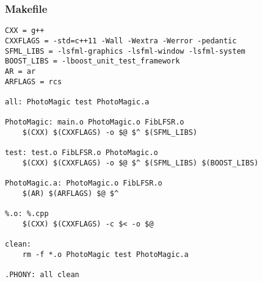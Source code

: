 \documentclass[12pt]{article}
\begin{document}
\subsubsection{Makefile}
\begin{lstlisting}[style=cppcode]
CXX = g++
CXXFLAGS = -std=c++11 -Wall -Wextra -Werror -pedantic
SFML_LIBS = -lsfml-graphics -lsfml-window -lsfml-system
BOOST_LIBS = -lboost_unit_test_framework
AR = ar
ARFLAGS = rcs

all: PhotoMagic test PhotoMagic.a

PhotoMagic: main.o PhotoMagic.o FibLFSR.o
	$(CXX) $(CXXFLAGS) -o $@ $^ $(SFML_LIBS)

test: test.o FibLFSR.o PhotoMagic.o
	$(CXX) $(CXXFLAGS) -o $@ $^ $(SFML_LIBS) $(BOOST_LIBS)

PhotoMagic.a: PhotoMagic.o FibLFSR.o
	$(AR) $(ARFLAGS) $@ $^

%.o: %.cpp
	$(CXX) $(CXXFLAGS) -c $< -o $@

clean:
	rm -f *.o PhotoMagic test PhotoMagic.a

.PHONY: all clean
\end{lstlisting}
\end{document}
